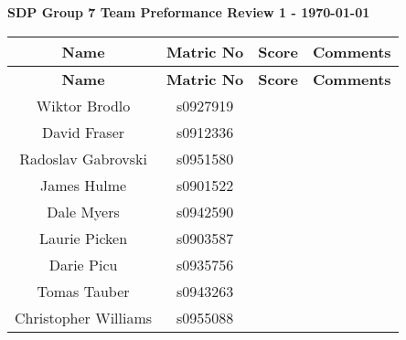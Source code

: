 \documentclass[10pt, a4paper]{article} %
\begin{document}
\textbf{SDP Group 7 Team Preformance Review 1 - \today}

\begin{longtable}{c c c p{3cm}}
    \textbf{Name} &
    \textbf{Matric No} &
    \textbf{Score} &
    \textbf{Comments}\\
    \hline
    \endfirsthead


    \textbf{Name} &
    \textbf{Matric No} &
    \textbf{Score} &
    \textbf{Comments}\\
    \hline
    \endhead

    Wiktor Brodlo &
    s0927919 &
    &
    \\

    David Fraser &
    s0912336 &
    &
    \\

    Radoslav Gabrovski &
    s0951580 &
    & 
    \\

    James Hulme &
    s0901522 &
    & 
    \\

    Dale Myers &
    s0942590 &
    &
    \\

    Laurie Picken &
    s0903587 &
    &
    \\

    Darie Picu &
    s0935756 &
    &
    \\

    Tomas Tauber &
    s0943263 &
    &
    \\

    Christopher Williams &
    s0955088 &
    &
    \\


\end{longtable}
\end{document}
